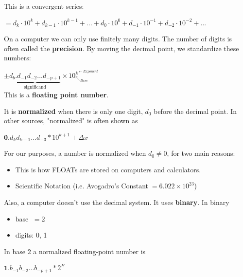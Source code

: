 \documentclass[a4paper,12pt,]{report}
\begin{document}
	This is a convergent series:

\begin{center}
	$=d_k\cdot10^k+d_{k-1}\cdot10^{k-1}+...+d_0\cdot10^0+d_{-1}\cdot10^{-1}+d_{-2}
		\cdot10^{-2}+...$
\end{center}

	On a computer we can only use finitely many digits.  The number of digits is often called the 
	\textbf{precision}. By moving the decimal point, we standardize these numbers:\\

\begin{center}
\fbox
{
	\parbox{0.5\textwidth}
	{
		\begin{center}
		$\pm \underbrace{d_b.d_{-1}d_{-2}...d_{-p+1}}_{\text{significand}}
			\times10_{\nwarrow_{ Base}}^{k^{\leftarrow Exponent}}$\\
		This is a \textbf{floating point number}.
		\end{center}
	}
}
\end{center}

	It is \textbf{normalized} when there is only one digit, $d_0$ before the decimal point.
	In  other sources, "normalized" is often shown as

\begin{center}
	$\textbf{0}.d_k d_{k-1} ... d_{-3} * 10^{k+1}+ \Delta x$
\end{center}

	For our purposes, a number is normalized when $d_0 \neq 0$, for two main reasons:

\begin{itemize}
	\item This is how FLOATs are stored on computers and calculators.
	\item Scientific Notation (i.e. Avogadro's Constant$\; =6.022 \times 10^{23}$)\\
\end{itemize}

	Also, a computer doesn't use the decimal system.  It uses \textbf{binary}. In binary

\begin{itemize}
	\item base $\; = 2$
	\item digits: 0, 1
\end{itemize}

	In base 2 a normalized floating-point number is

\begin{center}
	$\textbf{1}.b_{-1}b_{-2}...b_{-p+1}*2^E$
\end{center}
\end{document}
